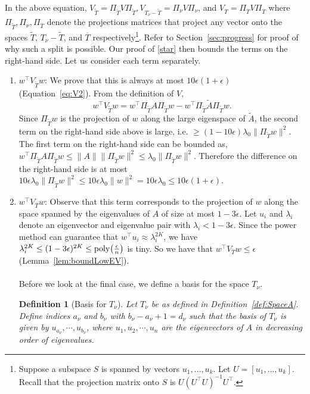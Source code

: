 \documentclass[11pt]{article}
\newtheorem{definition}[theorem]{Definition}
\newcommand\poly{\mathrm{poly}}  \newcommand{\comp}[1]{\overline{#1}}
\let\originalleft\left
\let\originalright\right
\renewcommand{\left}{\mathopen{}\mathclose\bgroup\originalleft}
\renewcommand{\right}{\aftergroup\egroup\originalright}
\newcommand\uu{\boldsymbol{\mathit{u}}}
\newcommand\ww{\boldsymbol{\mathit{w}}}
\renewcommand\AA{\boldsymbol{\mathit{A}}}
\newcommand\UU{\boldsymbol{\mathit{U}}}
\newcommand\VV{\boldsymbol{\mathit{V}}}
\newcommand\AAtil{\boldsymbol{\widetilde{\mathit{A}}}}
\begin{document}
In the above equation, $\VV_{\tilde{T}}= \Pi_{\tilde{T}}\VV\Pi_{\tilde{T}},\VV_{T_{\nu} -\tilde{T}}=\Pi_{\nu}\VV\Pi_{\nu}$, and $\VV_{\overline{T}} = \Pi_{\overline{T}}\VV\Pi_{\overline{T}}$ where $\Pi_{\tilde{T}},\Pi_{\nu},\Pi_{\overline{T}}$ denote the projections matrices that project any vector onto the spaces $\tilde{T}$, $T_{\nu}-\tilde{T}$, and $\overline{T}$ respectively\footnote{Suppose a subspace $S$ is spanned by vectors $\uu_1,\dots,\uu_k$. Let $\UU = [\uu_1,\dots,\uu_k]$. Recall that the projection matrix onto $S$ is $\UU(\UU^\top \UU)^{-1} \UU^\top$.}. Refer to Section~\ref{sec:progress} for proof of why such a split is possible. Our proof of \eqref{star} then bounds the terms on the right-hand side. Let us consider each term separately.
\begin{enumerate}
	\item $\ww^{\top}\VV_{\tilde{T}}\ww$: We prove that this is always at most $10\epsilon(1+\epsilon)$ (Equation~\eqref{eq:V2}). From the definition of $\VV,$ 
	\[
	\ww^{\top}\VV_{\tilde{T}}\ww = \ww^{\top}\Pi_{\tilde{T}}\AA\Pi_{\tilde{T}}\ww - \ww^{\top}\Pi_{\tilde{T}}\AAtil\Pi_{\tilde{T}}\ww.
	\] 
	Since $\Pi_{\tilde{T}}\ww$ is the projection of $\ww$ along the large eigenspace of $\AAtil$, the second term on the right-hand side above is large, i.e. $\geq (1- 10\epsilon)\lambda_0\|\Pi_{\tilde{T}}\ww\|^2$. The first term on the right-hand side can be bounded as, $\ww^{\top}\Pi_{\tilde{T}}\AA\Pi_{\tilde{T}}\ww \leq \|\AA\|\|\Pi_{\tilde{T}}\ww\|^2 \leq \lambda_0 \|\Pi_{\tilde{T}}\ww\|^2$.
 Therefore the difference on the right-hand side is at most $10\epsilon\lambda_0\|\Pi_{\tilde{T}}\ww\|^2 \leq 10 \epsilon\lambda_0\|\ww\|^2 = 10\epsilon \lambda_0 \leq 10\epsilon(1+\epsilon)$.
	\item $\ww^{\top}\VV_{\overline{T}}\ww$: Observe that this term corresponds to the projection of $\ww$ along the space spanned by the eigenvalues of $\AA$ of size at most $1-3\epsilon$. Let $\uu_i$ and $\lambda_i$ denote an eigenvector and eigenvalue pair with $\lambda_i<1-3\epsilon$. Since the power method can guarantee that $\ww^{\top}{\uu_i}\approx\lambda_i^{2K}$, we have  $\lambda_i^{2K} \leq (1-3\epsilon)^{2K}\leq \poly\left(\frac{\epsilon}{n}\right)$ is tiny. So we have that $\ww^{\top}\VV_{\overline{T}}\ww\leq \epsilon$ (Lemma~\ref{lem:boundLowEV}).

	\paragraph{}Before we look at the final case, we define a basis for the space $T_{\nu}$.
	\begin{definition}[Basis for $T_{\nu}$]\label{def:Basis} Let $T_{\nu}$ be as defined in Definition~\ref{def:SpaceA}.  Define indices $a_{\nu}$ and $b_{\nu}$ with $b_{\nu}-a_{\nu}+1 = d_{\nu}$ such that the basis of $T_{\nu}$ is given by $\uu_{a_{\nu}},\cdots, \uu_{b_{\nu}}$, where $\uu_1,\uu_2,\cdots,\uu_n$ are the eigenvectors of $\AA$ in decreasing order of eigenvalues.
	\end{definition}


\end{enumerate}
\end{document}
